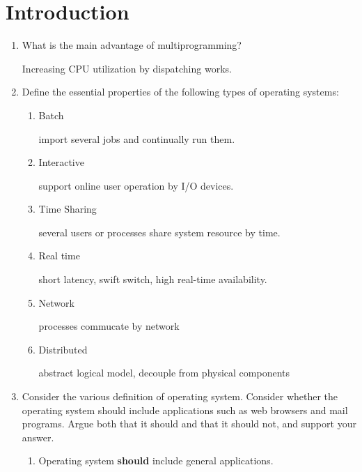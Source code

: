 \chapter{Introduction}

\begin{enumerate}
    \item What is the main advantage of multiprogramming?
    
    Increasing CPU utilization by dispatching works.
    
    \item Define the essential properties of the following types of operating systems:
    
    \begin{enumerate}
        \item Batch
        
        import several jobs and continually run them.
        
        \item Interactive
        
        support online user operation by I/O devices.
        
        \item Time Sharing
        
        several users or processes share system resource by time.
        
        \item Real time
        
        short latency, swift switch, high real-time availability.
        
        \item Network
        
        processes commucate by network
        
        \item Distributed 
        
        abstract logical model, decouple from physical components
    
    \end{enumerate}
    
    \item Consider the various definition of operating system. Consider whether the operating system should include applications such as web browsers and mail programs. Argue both that it should and that it should not, and support your answer.
    
    \begin{enumerate}
        \item Operating system \textbf{should} include general applications.
        

\end{enumerate}
\end{enumerate}
